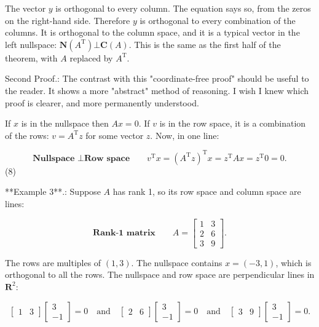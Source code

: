 The vector \(y\) is orthogonal to every column. The equation says so, from the zeros on the right-hand side. Therefore \(y\) is orthogonal to every combination of the columns. It is orthogonal to the column space, and it is a typical vector in the left nullspace: \(\boldsymbol{N}(A^{\mathrm{T}})\bot\boldsymbol{C}(A)\). This is the same as the first half of the theorem, with \(A\) replaced by \(A^{\mathrm{T}}\). 

Second Proof.: The contrast with this "coordinate-free proof" should be useful to the reader. It shows a more "abstract" method of reasoning. I wish I knew which proof is clearer, and more permanently understood.

If \(x\) is in the nullspace then \(Ax=0\). If \(v\) is in the row space, it is a combination of the rows: \(v=A^{\mathrm{T}}z\) for some vector \(z\). Now, in one line:

\[\textbf{Nullspace }\bot\textbf{Row space}\qquad v^{\mathrm{T}}x=(A^{\mathrm{T}}z)^{ \mathrm{T}}x=z^{\mathrm{T}}Ax=z^{\mathrm{T}}0=0.\] (8)

**Example 3**.: Suppose \(A\) has rank 1, so its row space and column space are lines:

\[\textbf{Rank-1 matrix}\qquad A=\begin{bmatrix}1&3\\ 2&6\\ 3&9\end{bmatrix}.\]

The rows are multiples of \((1,3)\). The nullspace contains \(x=(-3,1)\), which is orthogonal to all the rows. The nullspace and row space are perpendicular lines in \(\mathbf{R}^{2}\):

\[\begin{bmatrix}1&3\end{bmatrix}\begin{bmatrix}3\\ -1\end{bmatrix}=0\quad\text{and}\quad\begin{bmatrix}2&6\end{bmatrix} \begin{bmatrix}3\\ -1\end{bmatrix}=0\quad\text{and}\quad\begin{bmatrix}3&9\end{bmatrix} \begin{bmatrix}3\\ -1\end{bmatrix}=0.\] 